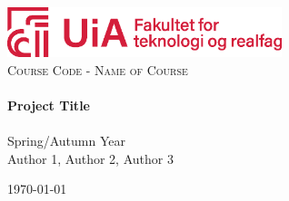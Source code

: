 \begin{titlepage}
    \vbox{ }

    \vbox{ }

    \begin{center}
        \includegraphics[width=0.6\textwidth]{Figures/Frontpage/tekreal}\\[4cm]
        \textsc{\Large Course Code - Name of Course}\\[0.7cm]

        \noindent\makebox[\linewidth]{\rule{.7\paperwidth}{.6pt}}\\[0.7cm]
        { \huge \bfseries Project Title}\\[0.25cm]
        \noindent\makebox[\linewidth]{\rule{.7\paperwidth}{.6pt}}\\[0.7cm]
        \large{Spring/Autumn Year}\\[1.2cm]
        \vfill
        \large
        Author 1, Author 2, Author 3

        {\large \today}
    \end{center}
\end{titlepage}